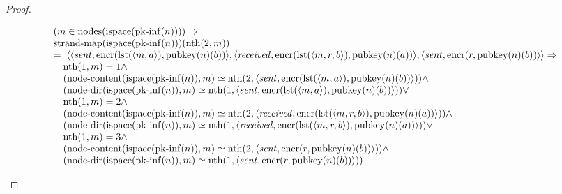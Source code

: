 \documentclass[11pt]{article}
\theoremstyle{plain}
\begin{document}
\begin{proof}
\begin{itemize}[leftmargin=2.8em, itemsep=4pt, parsep=1pt]
\begin{itemize}[leftmargin=2.8em, itemsep=4pt, parsep=1pt]
\begin{equation*}
\begin{array}{@{}l@{}}
\begin{array}{@{}l@{}} (m \in \operatorname{nodes}(\operatorname{ispace}(\operatorname{pk\text{-}inf}(n)))) \Rightarrow  \\ \operatorname{strand\text{-}map}(\operatorname{ispace}(\operatorname{pk\text{-}inf}(n)))(\operatorname{nth}(2, m)) \\ =\; \langle \langle \mathit{sent}, \operatorname{encr}(\operatorname{lst}(\langle m, a \rangle), \operatorname{pubkey}(n)(b)) \rangle, \langle \mathit{received}, \operatorname{encr}(\operatorname{lst}(\langle m, r, b \rangle), \operatorname{pubkey}(n)(a)) \rangle, \langle \mathit{sent}, \operatorname{encr}(r, \operatorname{pubkey}(n)(b)) \rangle \rangle \Rightarrow \\ \quad \operatorname{nth}(1, m) = 1 \wedge \\ \quad (\operatorname{node\text{-}content}(\operatorname{ispace}(\operatorname{pk\text{-}inf}(n)), m) \simeq \operatorname{nth}(2, \langle \mathit{sent}, \operatorname{encr}(\operatorname{lst}(\langle m, a \rangle), \operatorname{pubkey}(n)(b)) \rangle)) \wedge \\ \quad (\operatorname{node\text{-}dir}(\operatorname{ispace}(\operatorname{pk\text{-}inf}(n)), m) \simeq \operatorname{nth}(1, \langle \mathit{sent}, \operatorname{encr}(\operatorname{lst}(\langle m, a \rangle), \operatorname{pubkey}(n)(b)) \rangle)) \vee \\ \quad \operatorname{nth}(1, m) = 2 \wedge \\ \quad (\operatorname{node\text{-}content}(\operatorname{ispace}(\operatorname{pk\text{-}inf}(n)), m) \simeq \operatorname{nth}(2, \langle \mathit{received}, \operatorname{encr}(\operatorname{lst}(\langle m, r, b \rangle), \operatorname{pubkey}(n)(a)) \rangle)) \wedge \\ \quad (\operatorname{node\text{-}dir}(\operatorname{ispace}(\operatorname{pk\text{-}inf}(n)), m) \simeq \operatorname{nth}(1, \langle \mathit{received}, \operatorname{encr}(\operatorname{lst}(\langle m, r, b \rangle), \operatorname{pubkey}(n)(a)) \rangle)) \vee \\ \quad \operatorname{nth}(1, m) = 3 \wedge \\ \quad (\operatorname{node\text{-}content}(\operatorname{ispace}(\operatorname{pk\text{-}inf}(n)), m) \simeq \operatorname{nth}(2, \langle \mathit{sent}, \operatorname{encr}(r, \operatorname{pubkey}(n)(b)) \rangle)) \wedge \\ \quad (\operatorname{node\text{-}dir}(\operatorname{ispace}(\operatorname{pk\text{-}inf}(n)), m) \simeq \operatorname{nth}(1, \langle \mathit{sent}, \operatorname{encr}(r, \operatorname{pubkey}(n)(b)) \rangle)) \end{array} \\

\end{array}
\end{equation*}
\end{itemize}
\end{itemize}
\end{proof}
\end{document}
